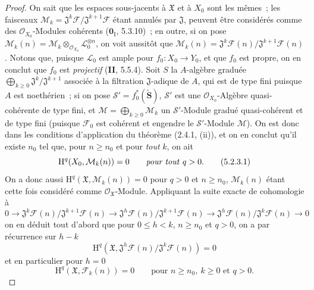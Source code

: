 \begin{proof}
On sait que les espaces sous-jacents à $\mathfrak X$ et à $X_0$ sont les mêmes~;
les faisceaux
$\mathcal M_k=\mathfrak J^k\mathcal F/\mathfrak J^{k+1}\mathcal F$
étant annulés par $\mathfrak J$, peuvent être considérés comme des
$\mathcal O_{X_0}$-Modules cohérents ($\mathbf{0}_{\mathrm I}$, 5.3.10)~; en outre, si on
pose $\mathcal M_k(n)=\mathcal M_k\otimes_{\mathcal O_{X_0}}
\mathcal L_0^{\otimes n}$, on voit aussitôt que
$\mathcal M_k(n)=\mathfrak J^k\mathcal F(n)/
\mathfrak J^{k+1}\mathcal F(n)$.
Notons que, puisque $\mathcal L_0$ est ample pour $f_0:X_0\to Y_0$, et
que $f_0$ est propre, on en conclut que $f_0$ est \emph{projectif} (\textbf{II}, 5.5.4). Soit $S$ la $A$-algèbre
graduée $\bigoplus_{k\geq0}\mathfrak J^k/\mathfrak J^{k+1}$ associée à la filtration $\mathfrak J$-adique de $A$, qui est
de type fini puisque $A$ est noethérien~; si on pose
$\mathcal S'=f_0^*(\widetilde{\mathbf S})$,
$\mathcal S'$ est une
$\mathcal O_{X_0}$-Algèbre quasi-cohérente de type fini, et
$\mathcal M=\bigoplus_{k\geq0}\mathcal M_k$ un
$\mathcal S'$-Module gradué quasi-cohérent et de type fini (puisque $\mathcal F_0$
est cohérent et engendre le $\mathcal S'$-Module $\mathcal M$). On est donc dans les
conditions d'application du théorème (2.4.1, (ii)), et on en conclut qu'il existe
$n_0$ tel que, pour $n\geq n_0$ et pour \emph{tout} $k$, on ait
\begin{equation}
\mathrm H^q(X_0,\mathcal M_k(n))=0\qquad\text{\emph{pour tout} }q>0.
\tag{5.2.3.1}
\label{III.5.2.3.1-fr}
\end{equation}
On a donc aussi $\mathrm H^q(\mathfrak X,\mathcal M_k(n))=0$ pour $q>0$ et
$n\geq n_0$, $\mathcal M_k(n)$ étant cette fois considéré comme
$\mathcal O_{\mathfrak X}$-Module. Appliquant la suite exacte de cohomologie à
\[
0\to
\mathfrak J^k\mathcal F(n)/\mathfrak J^{k+1}\mathcal F(n)
\to
\mathfrak J^h\mathcal F(n)/\mathfrak J^{k+1}\mathcal F(n)
\to
\mathfrak J^h\mathcal F(n)/\mathfrak J^k\mathcal F(n)
\to0
\]
on en déduit tout d'abord que pour $0\leq h<k$, $n\geq n_0$ et $q>0$, on a par
récurrence sur $h-k$
\begin{equation}
\mathrm H^q(\mathfrak X,
\mathfrak J^h\mathcal F(n)/\mathfrak J^k\mathcal F(n))=0
\tag{5.2.3.2}
\label{III.5.2.3.2-fr}
\end{equation}
et en particulier pour $h=0$
\begin{equation}
\mathrm H^q(\mathfrak X,\mathcal F_k(n))=0
\qquad\text{pour }n\geq n_0,\ k\geq0\text{ et }q>0.
\tag{5.2.3.3}
\label{III.5.2.3.3-fr}

\end{equation}
\end{proof}
